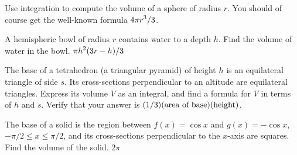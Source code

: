 \exercise Use integration to compute the volume of a sphere of radius
$r$. You should of course get the well-known formula $\displaystyle 4\pi r^3/3$.
\endexercise

\exercise
A hemispheric bowl of radius $r$ contains water to a depth $h$.  Find
the volume of water in the bowl.
\answer $\displaystyle \pi h^2(3r-h)/3$
\endanswer
\endexercise

\exercise The base of a tetrahedron (a triangular pyramid) of height $h$
is an equilateral triangle of side $s$.  Its cross-sections
perpendicular to an altitude are equilateral triangles.  Express its
volume $V$ as an integral, and find a formula for $V$ in terms of $h$
and $s$. Verify that your answer is $(1/3)(\hbox{area of
  base})(\hbox{height})$. 

\endexercise

\exercise
The base of a solid is the region between $f(x)=\cos x$ and
$g(x)=-\cos x$, $-\pi/2\le x\le\pi/2$,
and its cross-sections perpendicular to the $x$-axis 
are squares.
Find the volume of the solid.
\answer $2\pi$
\endanswer
\endexercise

\endexercises

